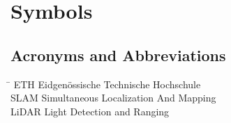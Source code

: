 \chapter*{Symbols}
\label{sec:symbols}

% 
% 
% 
\section*{Acronyms and Abbreviations}
\begin{tabbing}
 \hspace*{1.6cm}  \= \kill
 ETH \> Eidgenössische Technische Hochschule \\[0.5ex]
 SLAM \> Simultaneous Localization And Mapping \\[0.5ex]
 LiDAR \> Light Detection and Ranging \\[0.5ex]
\end{tabbing}
